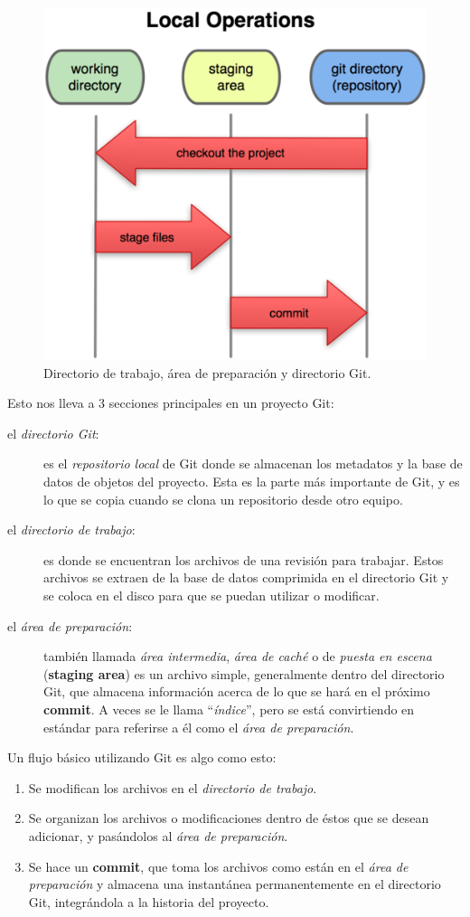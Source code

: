 \documentclass[12pt, spanish, oneside, onecolumn, a4paper]{report}
\begin{document}
\begin{figure} 
  \begin{center} 
    \includegraphics[width=.45\textwidth,keepaspectratio=true]{18333fig0106-tn.png} 
  \end{center} 
  \caption{Directorio de trabajo, área de preparación y directorio Git.} 
  \label{gitsnapshot} 
\end{figure}

Esto nos lleva a 3 secciones principales en un proyecto Git: 

\begin{description} 
\item [el \emph{directorio Git}:] es el \emph{repositorio local} de Git donde se almacenan los metadatos y la base de datos de objetos del proyecto. Esta es la parte más importante de Git, y es lo que se copia cuando se clona un repositorio desde otro equipo. 

\item [el \emph{directorio de trabajo}:] es donde se encuentran los archivos de una revisión para trabajar. Estos archivos se extraen de la base de datos comprimida en el directorio Git y se coloca en el disco para que se puedan utilizar o modificar. 

\item [el \emph{área de preparación}:] también llamada \emph{área intermedia}, \emph{área de caché} o de \emph{puesta en escena} (\textbf{staging area}) es un archivo simple, generalmente dentro del directorio Git, que almacena información acerca de lo que se hará en el próximo \textbf{commit}. A veces se le llama ``\emph{índice}'', pero se está convirtiendo en estándar para referirse a él como el \emph{área de preparación}. 
\end{description}

Un flujo básico utilizando Git es algo como esto: 

\begin{enumerate} 
\item Se modifican los archivos en el \emph{directorio de trabajo}. 
\item Se organizan los archivos o modificaciones dentro de éstos que se desean adicionar, y pasándolos al \emph{área de preparación}.
\item Se hace un \textbf{commit}, que toma los archivos como están en el \emph{área de preparación} y almacena una instantánea permanentemente en el directorio Git, integrándola a la historia del proyecto.
 \end{enumerate}
\end{document}
